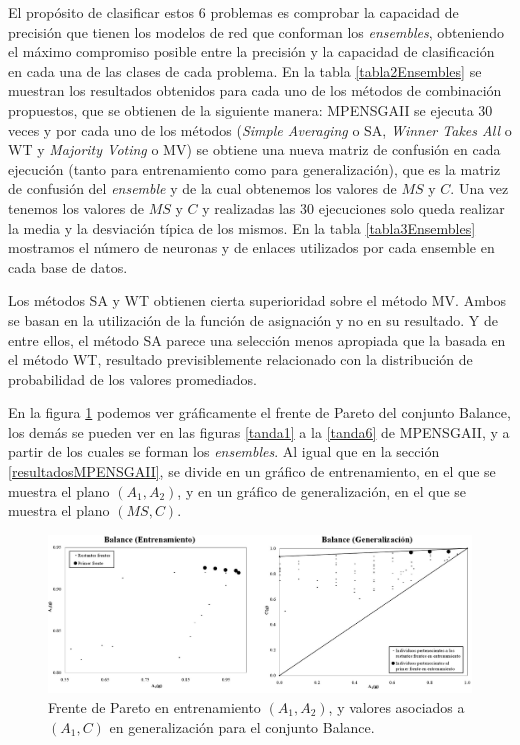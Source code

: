 El propósito de clasificar estos 6 problemas es comprobar la capacidad de precisión que
tienen los modelos de red que conforman los \textit{ensembles}, obteniendo el máximo
compromiso posible entre la precisión y la capacidad de clasificación en cada una de las
clases de cada problema. En la tabla \ref{tabla2Ensembles} se muestran los
resultados obtenidos para cada uno de los métodos de combinación propuestos, que se
obtienen de la siguiente manera: MPENSGAII se ejecuta 30 veces y  por cada uno de los
métodos (\textit{Simple Averaging} o SA, \textit{Winner Takes All} o WT y \textit{Majority Voting}
o MV) se obtiene una nueva matriz de confusión en cada ejecución (tanto para entrenamiento como
para generalización), que es la matriz de confusión del \textit{ensemble} y de la cual
obtenemos los valores de $MS$ y $C$. Una vez tenemos los valores de $MS$ y $C$ y realizadas las 30
ejecuciones solo queda realizar la media y la desviación típica de los mismos. En la tabla
\ref{tabla3Ensembles} mostramos el número de neuronas y de enlaces utilizados por cada ensemble en
cada base de datos.

Los métodos SA y WT obtienen cierta superioridad sobre el método MV. Ambos se basan en la
utilización de la función de asignación y no en su resultado. Y de entre ellos, el
método SA parece una selección menos apropiada que la basada en el método WT, resultado
previsiblemente relacionado con la distribución de probabilidad de los valores
promediados.

En la figura \ref{figura1Ensembles} podemos ver gráficamente el frente de Pareto del
conjunto Balance, los demás se pueden ver en las figuras \ref{tanda1} a la \ref{tanda6} de
MPENSGAII, y a partir de los cuales se forman los \textit{ensembles}. Al igual que en la sección
\ref{resultadosMPENSGAII}, se divide en un gráfico de entrenamiento, en el que se muestra
el plano $(A_{1},A_{2})$, y en un gráfico de generalización, en el que se muestra el
plano $(MS,C)$.

\begin{landscape}
\begin{figure}[htb!]
\centering
\includegraphics[keepaspectratio,width=18cm]{figuras/balanceEnsembles.jpg}
\caption{Frente de Pareto en entrenamiento $(A_{1},A_{2})$, y valores asociados a
$(A_{1},C)$ en generalización para el conjunto Balance.}
\label{figura1Ensembles}
\end{figure}
\end{landscape}

